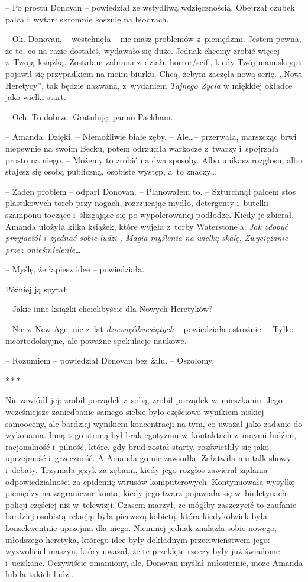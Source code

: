 \documentclass[oneside,polish,11pt,sfheadings]{mwbk}
\newcommand{\threeast}{\bigskip\par\centerline{*\,*\,*}\medskip\par}%
\begin{document}
-- Po prostu Donovan -- powiedział ze wstydliwą wdzięcznością. Obejrzał
czubek palca i~wytarł skromnie koszulę na biodrach.

-- Ok. Donovan, -- westchnęła -- nie masz problemów z~pieniędzmi. Jestem
pewna, że to, co na razie dostałeś, wydawało się duże. Jednak chcemy
zrobić więcej z~Twoją książką. Zostałam zabrana z~działu horror/scifi,
kiedy Twój manuskrypt pojawił się przypadkiem na moim biurku. Chcą,
żebym zaczęła nową serię. ,,Nowi Heretycy'', tak będzie nazwana, z~wydaniem \emph{Tajnego Życia }w miękkiej okładce jako wielki start.

-- Och. To dobrze. Gratuluję, panno Packham.

-- Amanda. Dzięki. -- Niemożliwie białe zęby. -- Ale\ldots -- przerwała,
marszcząc brwi niepewnie na swoim Becku, potem odrzuciła warkocze z~twarzy i~spojrzała prosto na niego. -- Możemy to zrobić na dwa sposoby.
Albo unikasz rozgłosu, albo stajesz się osobą publiczną, osobiste
występ, a~to znaczy\ldots

-- Żaden problem -- odparł Donovan. -- Planowałem to. -- Szturchnął palcem
stos plastikowych toreb przy nogach, rozrzucając mydło, detergenty i~butelki szamponu toczące i~ślizgające się po wypolerowanej podłodze.
Kiedy je zbierał, Amanda ułożyła kilka książek, które wyjęła z~torby
Waterstone'a: \emph{Jak zdobyć przyjaciół i~zjednać sobie ludzi , Magia
myślenia na wielką skalę, Zwyciężanie przez onieśmielenie}\ldots

-- Myślę, że łapiesz idee -- powiedziała.

Później ją spytał: 

-- Jakie inne książki chcielibyście dla Nowych
Heretyków?

-- Nic z~New Age, nic z~lat \emph{dziewięćdziesiątych} -- powiedziała
ostrożnie. -- Tylko nieortodoksyjne, ale poważne spekulacje naukowe.

-- Rozumiem -- powiedział Donovan bez żalu. -- Oszołomy.
  \threeast 

Nie zawiódł jej: zrobił porządek z~sobą, zrobił porządek w~mieszkaniu.
Jego wcześniejsze zaniedbanie samego siebie było częściowo wynikiem
niskiej samooceny, ale bardziej wynikiem koncentracji na tym, co uważał
jako zadanie do wykonania. Inną tego stroną był brak egotyzmu w~kontaktach z~innymi ludźmi, racjonalność i~pilność, które, gdy brud
został starty, rozświetliły się jako uprzejmość i~grzeczność. A Amanda
go nie zawiodła. Załatwiła mu talk-showy i~debaty. Trzymała język za
zębami, kiedy jego rozgłos zawierał żądania odpowiedzialności za
epidemię wirusów komputerowych. Kontynuowała wysyłkę pieniędzy na
zagraniczne konta, kiedy jego twarz pojawiała się w~biuletynach policji
częściej niż w~telewizji. Czasem marzył, że mógłby zaszczycić to
zaufanie bardziej osobistą relacją: była pierwszą kobietą, która
kiedykolwiek była konsekwentnie uprzejma dla niego. Niemniej jednak
znalazła sobie nowego, młodszego heretyka, którego idee były dokładnym
przeciwieństwem jego: wyzwoliciel maszyn, który uważał, że te przeklęte
rzeczy były już świadome i~uciskane. Oczywiście omamiony, ale, Donovan
myślał miłosiernie, może Amanda lubiła takich ludzi.
\end{document}
